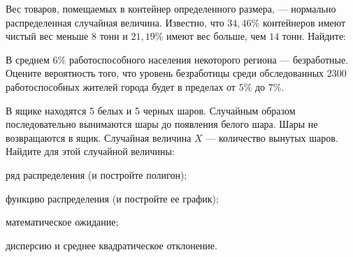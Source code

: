 \vfil

\begin{zkrPlain}{25}\noindent 
	Вес товаров, помещаемых в контейнер определенного размера, — нормально распределенная случайная величина. Известно, что $34{,}46\%$ контейнеров имеют чистый вес меньше $8$ тонн и $21{,}19\%$ имеют вес больше, чем $14$ тонн. Найдите: \par {}
 
\end{zkrPlain}

\vfil

\begin{zkrPlain}{25}\noindent 
	В среднем $ 6 \% $ работоспособного населения некоторого региона --- безработные. Оцените вероятность того, что уровень безработицы среди обследованных $ 2300 $ работоспособных жителей города будет в пределах от $ 5 \% $ до $ 7 \% $.
 
\end{zkrPlain}

\newpage\setcounter{zad}{0}\setcounter{footnote}{0}



\begin{zkrPlain}{25}\noindent 
	В ящике находятся 5 белых и 5 черных шаров. Случайным образом последовательно вынимаются шары до появления белого шара. Шары не возвращаются в ящик. Случайная величина $X$ --- количество вынутых шаров.  Найдите для этой случайной величины: \par \smallskip\small{ \par \zz ряд распределения (и постройте полигон); \par \zz функцию распределения (и постройте ее график); \par \zz математическое ожидание; \par \zz дисперсию и среднее квадратическое отклонение.\par \par}
 
\end{zkrPlain}

\vfil


